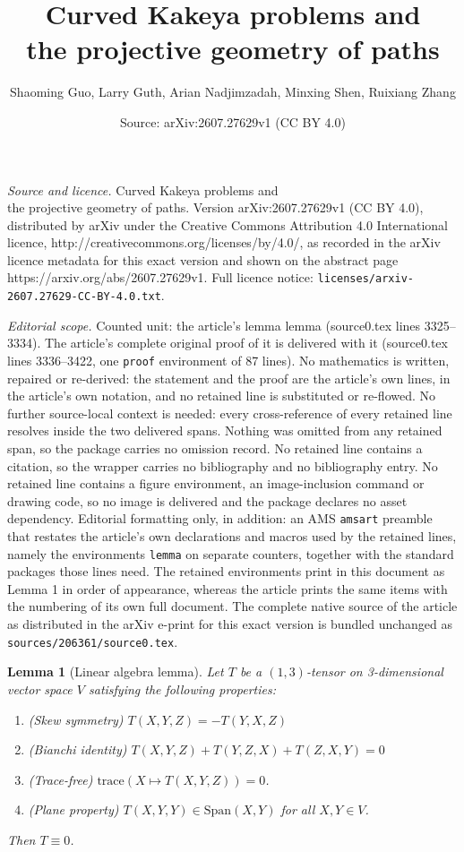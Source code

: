 \documentclass[10pt,a4paper]{amsart}
\title{Curved Kakeya problems and \\the projective geometry of paths}
\author{Shaoming Guo, Larry Guth, Arian Nadjimzadah, Minxing Shen, Ruixiang Zhang}
\date{Source: arXiv:2607.27629v1 (CC BY 4.0)}
\newtheorem{lemma}{Lemma}
\begin{document}
\maketitle

\noindent\emph{Source and licence.} Curved Kakeya problems and \\the projective geometry of paths. Version arXiv:2607.27629v1 (CC BY 4.0), distributed by arXiv under the Creative Commons Attribution 4.0 International licence, http://creativecommons.org/licenses/by/4.0/, as recorded in the arXiv licence metadata for this exact version and shown on the abstract page https://arxiv.org/abs/2607.27629v1. Full licence notice: \texttt{licenses/arxiv-2607.27629-CC-BY-4.0.txt}.\par\smallskip

\noindent\textit{Editorial scope.} Counted unit: the article's lemma lemma (source0.tex lines 3325--3334). The article's complete original proof of it is delivered with it (source0.tex lines 3336--3422, one \texttt{proof} environment of 87 lines). No mathematics is written, repaired or re-derived: the statement and the proof are the article's own lines, in the article's own notation, and no retained line is substituted or re-flowed.  No further source-local context is needed: every cross-reference of every retained line resolves inside the two delivered spans.  Nothing was omitted from any retained span, so the package carries no omission record.  No retained line contains a citation, so the wrapper carries no bibliography and no bibliography entry.  No retained line contains a figure environment, an image-inclusion command or drawing code, so no image is delivered and the package declares no asset dependency.  Editorial formatting only, in addition: an AMS \texttt{amsart} preamble that restates the article's own declarations and macros used by the retained lines, namely the environments \texttt{lemma} on separate counters, together with the standard packages those lines need.  The retained environments print in this document as Lemma 1 in order of appearance, whereas the article prints the same items with the numbering of its own full document.  The complete native source of the article as distributed in the arXiv e-print for this exact version is bundled unchanged as \texttt{sources/206361/source0.tex}.
    \begin{lemma}[Linear algebra lemma]\label{lem: lin alg lemma}
    Let $T$ be a $(1,3)$-tensor on 3-dimensional vector space $V$ satisfying the following properties: 
    \begin{enumerate}
        \item (Skew symmetry) $T(X,Y,Z) = -T(Y,X,Z)$ 
        \item (Bianchi identity) $T(X,Y,Z) + T(Y,Z,X)+T(Z,X,Y) = 0$ 
        \item (Trace-free) $\mathrm{trace}(X \mapsto T(X,Y,Z)) = 0$.
        \item (Plane property) $T(X,Y,Y) \in \mathrm{Span}(X,Y)$ for all $X,Y \in V$.
    \end{enumerate}
    Then $T \equiv 0$. 
    \end{lemma}
\end{document}
